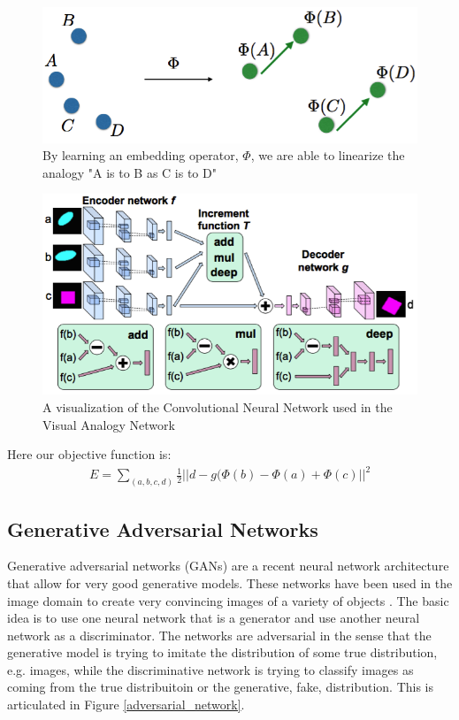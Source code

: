 \documentclass{article}
\begin{document}
\begin{figure}[h]
    \centering
    \includegraphics[scale=0.40]{embed_linear.png}
    \caption{By learning an embedding operator, $\Phi$, we are able to linearize the analogy "A is to B as C is to D"}
    \label{embed_linear}
\end{figure}

\begin{figure}[h]
    \centering
    \includegraphics[scale=0.40]{analogy_network.png}
    \caption{A visualization of the Convolutional Neural Network used in the Visual Analogy Network}
    \label{analogy_network}
\end{figure}

Here our objective function is:
\begin{eqnarray*}
E = \sum_{(a,b,c,d)} \frac{1}{2}||d - g(\Phi(b) - \Phi(a) + \Phi(c)||^2
\end{eqnarray*}

\subsection{Generative Adversarial Networks}
Generative adversarial networks (GANs) \cite{goodfellow2014generative} are a recent neural network architecture that allow for very good generative models. These networks have been used in the image domain to create very convincing images of a variety of objects \cite{denton2015deep}. The basic idea is to use one neural network that is a generator and use another neural network as a discriminator. The networks are adversarial in the sense that the generative model is trying to imitate the distribution of some true distribution, e.g. images, while the discriminative network is trying to classify images as coming from the true distribuitoin or the generative, fake, distribution. This is articulated in Figure \ref{adversarial_network}.
\end{document}
